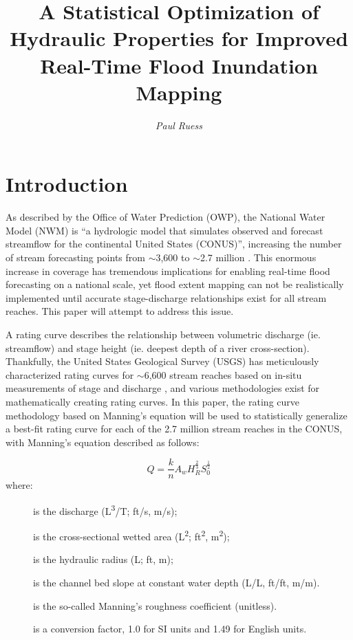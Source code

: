 \documentclass[11pt]{article}
\title{\textbf{A Statistical Optimization of Hydraulic Properties for Improved Real-Time Flood Inundation Mapping}}
\author{\textit{Paul Ruess}}
\date{\vspace{-11pt}}
\begin{document}
\maketitle

\section*{Introduction} %
As described by the Office of Water Prediction (OWP), the National Water Model (NWM) is ``a hydrologic model that simulates observed and forecast streamflow for the continental United States (CONUS)'', increasing the number of stream forecasting points from $\sim$3,600 to $\sim$2.7 million \cite{nwmsummary}. This enormous increase in coverage has tremendous implications for enabling real-time flood forecasting on a national scale, yet flood extent mapping can not be realistically implemented until accurate stage-discharge relationships exist for all stream reaches. This paper will attempt to address this issue. 

A rating curve describes the relationship between volumetric discharge (ie. streamflow) and stage height (ie. deepest depth of a river cross-section). Thankfully, the United States Geological Survey (USGS) has meticulously characterized rating curves for $\sim$6,600 stream reaches based on in-situ measurements of stage and discharge \cite{usgswaterwatch}, and various methodologies exist for mathematically creating rating curves. In this paper, the rating curve methodology based on Manning's equation will be used to statistically generalize a best-fit rating curve for each of the 2.7 million stream reaches in the CONUS, with Manning's equation described as follows:

\begin{equation}
Q = \frac{k}{n}A_wH_R^\frac{2}{3}S_0^\frac{1}{2}
\end{equation}
where: 
\begin{description}
  \item[] is the discharge (L\textsuperscript{3}/T; ft/s, m/s);
  \item[] is the cross-sectional wetted area (L\textsuperscript{2}; ft\textsuperscript{2}, m\textsuperscript{2});
  \item[] is the hydraulic radius (L; ft, m);
  \item[] is the channel bed slope at constant water depth (L/L, ft/ft, m/m).
  \item[] is the so-called Manning's roughness coefficient (unitless). 
  \item[] is a conversion factor, 1.0 for SI units and 1.49 for English units.
\end{description}
\end{document}
